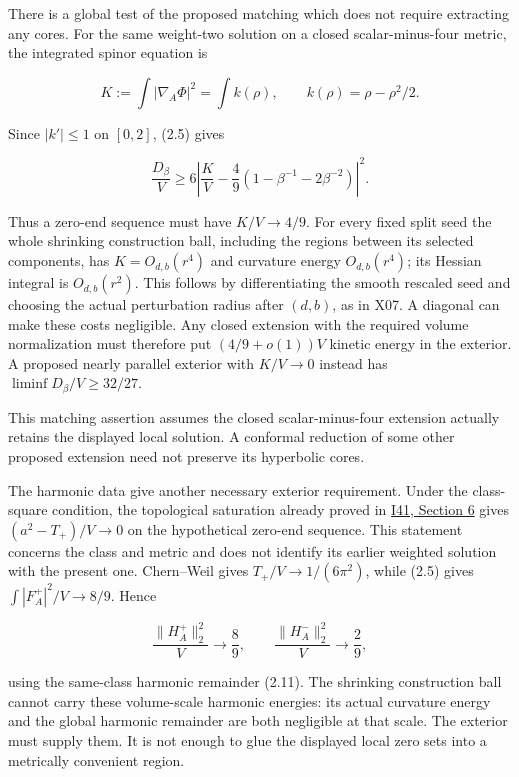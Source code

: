 \documentclass[
  10pt,
]{article}
\begin{document}
There is a global test of the proposed matching which does not require
extracting any cores. For the same weight-two solution on a closed
scalar-minus-four metric, the integrated spinor equation is

\[
 K:=\int|\nabla_A\Phi|^2=\int k(\rho),\qquad
 k(\rho)=\rho-\rho^2/2.
\]

Since \(|k'|\le1\) on \([0,2]\), (2.5) gives

\[
 \boxed{\frac{D_\beta}{V}\ge
 6\left|\frac KV-\frac49(1-\beta^{-1}-2\beta^{-2})\right|^2.}
 \tag{4.7}
\]

Thus a zero-end sequence must have \(K/V\to4/9\). For every fixed split
seed the whole shrinking construction ball, including the regions
between its selected components, has \(K=O_{d,b}(r^4)\) and curvature
energy \(O_{d,b}(r^4)\); its Hessian integral is \(O_{d,b}(r^2)\). This
follows by differentiating the smooth rescaled seed and choosing the
actual perturbation radius after \((d,b)\), as in X07. A diagonal can
make these costs negligible. Any closed extension with the required
volume normalization must therefore put \((4/9+o(1))V\) kinetic energy
in the exterior. A proposed nearly parallel exterior with \(K/V\to0\)
instead has \(\liminf D_\beta/V\ge32/27\).

This matching assertion assumes the closed scalar-minus-four extension
actually retains the displayed local solution. A conformal reduction of
some other proposed extension need not preserve its hyperbolic cores.

The harmonic data give another necessary exterior requirement. Under the
class-square condition, the topological saturation already proved in
\href{20260927_conformal_separation_and_zero_end.md}{I41, Section 6}
gives \((a^2-T_+)/V\to0\) on the hypothetical zero-end sequence. This
statement concerns the class and metric and does not identify its
earlier weighted solution with the present one. Chern--Weil gives
\(T_+/V\to1/(6\pi^2)\), while (2.5) gives \(\int|F_A^+|^2/V\to8/9\).
Hence

\[
 \frac{\|H_A^+\|_2^2}{V}\to\frac89,\qquad
 \frac{\|H_A^-\|_2^2}{V}\to\frac29,
 \tag{4.8}
\]

using the same-class harmonic remainder (2.11). The shrinking
construction ball cannot carry these volume-scale harmonic energies: its
actual curvature energy and the global harmonic remainder are both
negligible at that scale. The exterior must supply them. It is not
enough to glue the displayed local zero sets into a metrically
convenient region.
\end{document}
